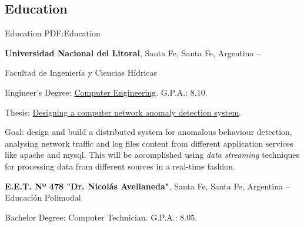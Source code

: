 \documentclass[letterpaper,MMMyyyy,nonstop]{simpleresumecv}
\begin{document}
\begin{body}


\section
{Education}
{Education}
{PDF:Education}

\textbf{Universidad Nacional del Litoral},
Santa Fe, Santa Fe, Argentina
\hfill
{} --

\BulletItem Facultad de Ingeniería y Ciencias Hídricas
\begin{detail}
	\SubBulletItem
	Engineer's Degree: \href{http://fich.unl.edu.ar/planificaciones/carrera.php?id=3}{Computer Engineering}.
	\SubBulletItem
	G.P.A.: 8.10.
\end{detail}
\BulletItem	Thesis: \href{https://github.com/leandropineda/sketch-ws}{Designing a computer network anomaly detection system}.
\begin{detail}
	\SubBulletItem
	Goal: design and build a distributed system for anomalous behaviour detection, analysing network traffic and log files content from different application services like apache and mysql. This will be accomplished using \textit{data streaming} techniques for processing data from different sources in a real-time fashion.
\end{detail}

\BigGap
\textbf{E.E.T. Nº 478 "Dr. Nicolás Avellaneda"},
Santa Fe, Santa Fe, Argentina
\hfill
{} --
\BulletItem Educación Polimodal
\begin{detail}
	\SubBulletItem
	Bachelor Degree: Computer Technician.
	\SubBulletItem
	G.P.A.: 8.05.
\end{detail}

%
%



\end{body}
\end{document}
